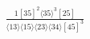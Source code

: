 \documentclass[varwidth, border=5pt]{standalone}
\begin{document}
\begin{my}
$\begin{gathered}
\scriptscriptstyle\frac{1[35]^2⟨35⟩^3[25]}{⟨13⟩⟨15⟩⟨23⟩⟨34⟩[45]^3}
\end{gathered}$
\end{my}
\end{document}

